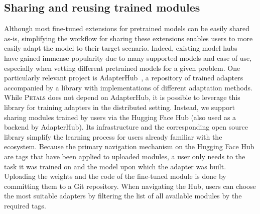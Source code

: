 






\subsection{Sharing and reusing trained modules}
\label{sect:design_ecosystem}

Although most fine-tuned extensions for pretrained models can be easily shared as-is, simplifying the workflow for sharing these extensions enables users to more easily adapt the model to their target scenario. Indeed, existing model hubs~\cite{wolf-etal-2020-transformers, tfhub, torchhub} have gained immense popularity due to many supported models and ease of use, especially when vetting different pretrained models for a given problem. One particularly relevant project is AdapterHub~\cite{adapterhub}, a repository of trained adapters accompanied by a library with implementations of different adaptation methods. While \textsc{Petals} does not depend on AdapterHub, it is possible to leverage this library for training adapters in the distributed setting.
Instead, we support sharing modules trained by users via the Hugging Face Hub (also used as a backend by AdapterHub). Its infrastructure and the corresponding open source library simplify the learning process for users already familiar with the ecosystem. Because the primary navigation mechanism on the Hugging Face Hub are tags that have been applied to uploaded modules, a user only needs to the task it was trained on and the model upon which the adapter was built. Uploading the weights and the code of the fine-tuned module is done by committing them to a Git repository.
When navigating the Hub, users can choose the most suitable adapters by filtering the list of all available modules by the required tags.